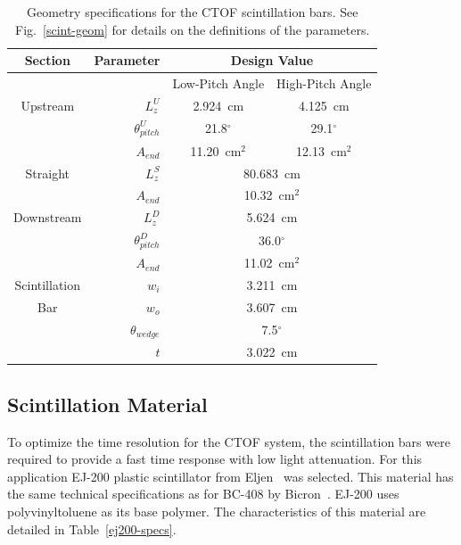 \documentclass{elsart}
\begin{document}
\begin{table}[htbp]
\begin{center}
\begin{tabular} {c|r|cc} \hline
Section       & Parameter          & \multicolumn{2}{c}{Design Value} \\ \hline
              &                    & Low-Pitch Angle & High-Pitch Angle \\ \cline{3-4}
Upstream      & $L_z^U$            & 2.924~cm  & 4.125~cm	  \\
              & $\theta_{pitch}^U$ & 21.8$^\circ$ & 29.1$^\circ$ \\
              & $A_{end}$          & 11.20~cm$^2$ & 12.13~cm$^2$ \\ \hline
Straight      & $L_z^S$            & \multicolumn{2}{c}{80.683~cm}    \\
              & $A_{end}$          & \multicolumn{2}{c}{10.32~cm$^2$} \\ \hline
Downstream    & $L_z^D$            & \multicolumn{2}{c}{5.624~cm}     \\
              & $\theta_{pitch}^D$ & \multicolumn{2}{c}{36.0$^\circ$} \\
              & $A_{end}$          & \multicolumn{2}{c}{11.02~cm$^2$} \\ \hline
Scintillation & $w_i$              & \multicolumn{2}{c}{3.211~cm}     \\ 
Bar           & $w_o$              & \multicolumn{2}{c}{3.607~cm}     \\  
              & $\theta_{wedge}$   & \multicolumn{2}{c}{7.5$^\circ$}  \\ 
              & $t$                & \multicolumn{2}{c}{3.022~cm}  \\ \hline   
\end{tabular}
\end{center}
\caption{Geometry specifications for the CTOF scintillation bars. See Fig.~\ref{scint-geom}
for details on the definitions of the parameters.}
\label{bar-geom}
\end{table}

\subsection{Scintillation Material}
\label{scint-mat}

To optimize the time resolution for the CTOF system, the scintillation bars were required to
provide a fast time response with low light attenuation. For this application EJ-200 plastic
scintillator from Eljen~\cite{eljen-ref}  was selected. This material has the same technical
specifications as for BC-408 by Bicron~\cite{bicron-ref}. EJ-200 uses polyvinyltoluene as its
base polymer. The characteristics of this material are detailed in Table~\ref{ej200-specs}.
\end{document}
